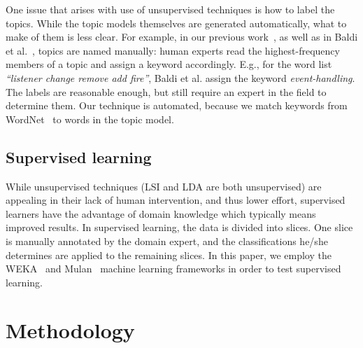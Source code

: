 \documentclass{acm_proc_article-sp}
\begin{document}
One issue that arises with use of unsupervised techniques is how to label the topics. While the topic models themselves are generated automatically, what to make of them is less clear. For example, in our previous work~\cite{Hindle09ICSM}, as well as in Baldi et al.~\cite{Baldi2008}, topics are named manually: human experts read the highest-frequency members of a topic and assign a keyword accordingly. E.g., for the word list \emph{``listener change remove add fire''}, Baldi et al. assign the keyword \emph{event-handling}. The labels are reasonable enough, but still require an expert in the field to determine them. Our technique is automated, because we match keywords from WordNet~\cite{Fellbaum1998} to words in the topic model. 

\subsection{Supervised learning}
While unsupervised techniques (LSI and LDA are both unsupervised) are appealing in their lack of human intervention, and thus lower effort, supervised learners have the advantage of domain knowledge which typically means improved results. In supervised learning, the data is divided into slices. One slice is manually annotated by the domain expert, and the classifications he/she determines are applied to the remaining slices. In this paper, we employ the WEKA~\cite{weka09} and Mulan~\cite{mulan} machine learning frameworks in order to test supervised learning.

 
\section{Methodology}

\end{document}
